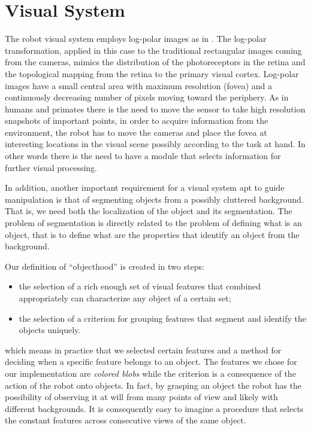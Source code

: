 \section{Visual System}
\label{sect:vision}

The robot visual system employs log-polar images as in \cite{sandini80retinalike}. The log-polar transformation, applied in this case to the traditional rectangular images coming from the cameras, mimics the distribution of the photoreceptors in the retina and the topological mapping from the retina to the primary visual cortex. Log-polar images have a small central area with maximum resolution (fovea) and a continuously decreasing number of pixels moving toward the periphery. As in humans and primates there is the need to move the sensor to take high resolution snapshots of important points, in order to acquire information from the environment, the robot has to move the cameras and place the fovea at interesting locations in the visual scene possibly according to the task at hand. In other words there is the need to have a module that selects information for further visual processing.

In addition, another important requirement for a visual system apt to guide manipulation is that of segmenting objects from a possibly cluttered background. That is, we need both the localization of the object and its segmentation. The problem of segmentation is directly related to the problem of defining what is an object, that is to define what are the properties that identify an object from the background.

Our definition of ``objecthood'' is created in two steps:
\begin{itemize}
\item the selection of a rich enough set of visual features that combined appropriately can characterize any object of a certain set;
\item the selection of a criterion for grouping features that segment and identify the objects uniquely.
\end{itemize}
\noindent which means in practice that we selected certain features and a method for deciding when a specific feature belongs to an object. The features we chose for our implementation are {\em colored blobs} while the criterion is a consequence of the action of the robot onto objects. In fact, by grasping an object the robot has the possibility of observing it at will from many points of view and likely with different backgrounds. It is consequently easy to imagine a procedure that selects the constant features across consecutive views of the same object.

